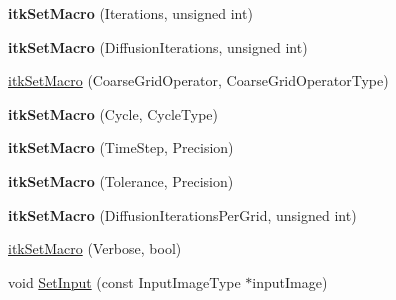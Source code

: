 \begin{DoxyCompactItemize}
\item 
\hypertarget{classitk_1_1_v_e_d_multigrid_image_filter_a08bf9b177cd9ac26845da6aa995ffc6a}{{\bfseries itk\-Set\-Macro} (Iterations, unsigned int)}\label{classitk_1_1_v_e_d_multigrid_image_filter_a08bf9b177cd9ac26845da6aa995ffc6a}

\item 
\hypertarget{classitk_1_1_v_e_d_multigrid_image_filter_a71691b1fa6b5ea9490e2cb509ba38bf7}{{\bfseries itk\-Set\-Macro} (Diffusion\-Iterations, unsigned int)}\label{classitk_1_1_v_e_d_multigrid_image_filter_a71691b1fa6b5ea9490e2cb509ba38bf7}

\item 
\hyperlink{classitk_1_1_v_e_d_multigrid_image_filter_aab2fb17d7dfabd19af4009ddea3f67f1}{itk\-Set\-Macro} (Coarse\-Grid\-Operator, Coarse\-Grid\-Operator\-Type)
\item 
\hypertarget{classitk_1_1_v_e_d_multigrid_image_filter_aff8194cac314541f0e98d7adb876ffad}{{\bfseries itk\-Set\-Macro} (Cycle, Cycle\-Type)}\label{classitk_1_1_v_e_d_multigrid_image_filter_aff8194cac314541f0e98d7adb876ffad}

\item 
\hypertarget{classitk_1_1_v_e_d_multigrid_image_filter_a832d02ed6da4e69a9e8aa8f1f7a8f541}{{\bfseries itk\-Set\-Macro} (Time\-Step, Precision)}\label{classitk_1_1_v_e_d_multigrid_image_filter_a832d02ed6da4e69a9e8aa8f1f7a8f541}

\item 
\hypertarget{classitk_1_1_v_e_d_multigrid_image_filter_a8a980466133156d782b1db394f595730}{{\bfseries itk\-Set\-Macro} (Tolerance, Precision)}\label{classitk_1_1_v_e_d_multigrid_image_filter_a8a980466133156d782b1db394f595730}

\item 
\hypertarget{classitk_1_1_v_e_d_multigrid_image_filter_abe42c9105de2a52b7b8912afd5cf8136}{{\bfseries itk\-Set\-Macro} (Diffusion\-Iterations\-Per\-Grid, unsigned int)}\label{classitk_1_1_v_e_d_multigrid_image_filter_abe42c9105de2a52b7b8912afd5cf8136}

\item 
\hyperlink{classitk_1_1_v_e_d_multigrid_image_filter_aa483bcbaf19bd8b9128e143158238aca}{itk\-Set\-Macro} (Verbose, bool)
\item 
void \hyperlink{classitk_1_1_v_e_d_multigrid_image_filter_aa6accfcc728e7553c92c8a551c30ab11}{Set\-Input} (const Input\-Image\-Type $\ast$input\-Image)
\end{DoxyCompactItemize}
